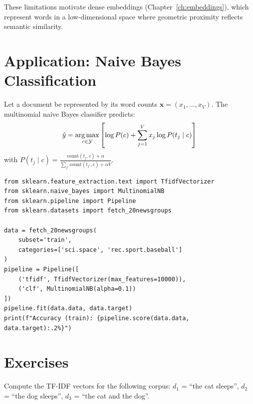 These limitations motivate dense embeddings (Chapter~\ref{ch:embeddings}),
which represent words in a low-dimensional space where geometric proximity
reflects semantic similarity.

\section{Application: Naive Bayes Classification}
\label{sec:rep:naivebayes}

\begin{definition}
Let a document be represented by its word counts $\mathbf{x} = (x_1, \ldots, x_V)$.
The multinomial naive Bayes classifier predicts:
\[
\hat{y} = \operatorname*{arg\,max}_{c \in \mathcal{Y}} \left[\log P(c) + \sum_{j=1}^{V} x_j \log P(t_j \mid c)\right]
\]
with $P(t_j \mid c) = \frac{\text{count}(t_j, c) + \alpha}{\sum_{j'} \text{count}(t_{j'}, c) + \alpha V}$.
\end{definition}

\begin{codeblock}[title=\textbf{Naive Bayes classification}]
\begin{verbatim}
from sklearn.feature_extraction.text import TfidfVectorizer
from sklearn.naive_bayes import MultinomialNB
from sklearn.pipeline import Pipeline
from sklearn.datasets import fetch_20newsgroups

data = fetch_20newsgroups(
    subset='train',
    categories=['sci.space', 'rec.sport.baseball']
)
pipeline = Pipeline([
    ('tfidf', TfidfVectorizer(max_features=10000)),
    ('clf', MultinomialNB(alpha=0.1))
])
pipeline.fit(data.data, data.target)
print(f"Accuracy (train): {pipeline.score(data.data, data.target):.2%}")
\end{verbatim}
\end{codeblock}

\section{Exercises}
\label{sec:rep:exercises}

\begin{exercise}[$\star$]
Compute the TF-IDF vectors for the following corpus:
$d_1$ = ``the cat sleeps'', $d_2$ = ``the dog sleeps'',
$d_3$ = ``the cat and the dog''.
\end{exercise}


